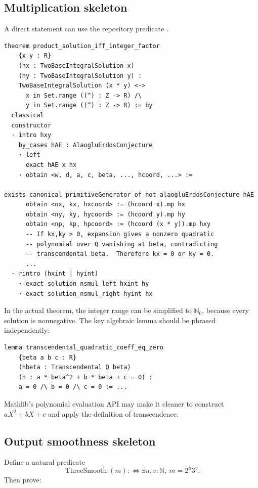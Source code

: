 \documentclass[11pt,oneside]{article}
\theoremstyle{definition}
\newcommand{\N}{\mathbb N}
\newcommand{\Nzero}{\mathbb N_0}
\newcommand{\lean}[1]{\texttt{\detokenize{#1}}}
\begin{document}
\subsection{Multiplication skeleton}

A direct statement can use the repository predicate
\lean{TwoBaseIntegralSolution}.

\begin{lstlisting}[language={}]
theorem product_solution_iff_integer_factor
    {x y : R}
    (hx : TwoBaseIntegralSolution x)
    (hy : TwoBaseIntegralSolution y) :
    TwoBaseIntegralSolution (x * y) <->
      x in Set.range ((^) : Z -> R) /\
      y in Set.range ((^) : Z -> R) := by
  classical
  constructor
  · intro hxy
    by_cases hAE : AlaogluErdosConjecture
    · left
      exact hAE x hx
    · obtain <w, d, a, c, beta, ..., hcoord, ...> :=
        exists_canonical_primitiveGenerator_of_not_alaogluErdosConjecture hAE
      obtain <nx, kx, hxcoord> := (hcoord x).mp hx
      obtain <ny, ky, hycoord> := (hcoord y).mp hy
      obtain <np, kp, hpcoord> := (hcoord (x * y)).mp hxy
      -- If kx,ky > 0, expansion gives a nonzero quadratic
      -- polynomial over Q vanishing at beta, contradicting
      -- transcendental beta.  Therefore kx = 0 or ky = 0.
      ...
  · rintro (hxint | hyint)
    · exact solution_nsmul_left hxint hy
    · exact solution_nsmul_right hyint hx
\end{lstlisting}

In the actual theorem, the integer range can be simplified to \(\Nzero\), because every
solution is nonnegative.  The key algebraic lemma should be phrased independently:

\begin{lstlisting}[language={}]
lemma transcendental_quadratic_coeff_eq_zero
    {beta a b c : R}
    (hbeta : Transcendental Q beta)
    (h : a * beta^2 + b * beta + c = 0) :
    a = 0 /\ b = 0 /\ c = 0 := ...
\end{lstlisting}

Mathlib's polynomial evaluation API may make it cleaner to construct
\(aX^2+bX+c\) and apply the definition of transcendence.

\subsection{Output smoothness skeleton}

Define a natural predicate
\[
  \operatorname{ThreeSmooth}(m):\Longleftrightarrow
  \exists u,v:\N,\ m=2^u3^v.
\]
Then prove:
\end{document}
